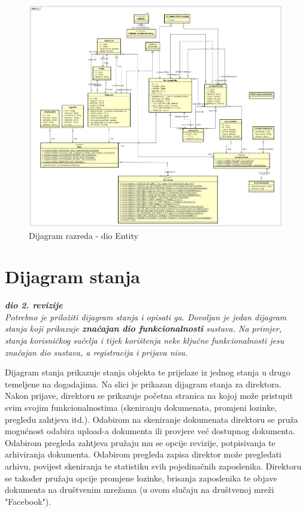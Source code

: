 			\begin{figure}[H]
				\includegraphics[scale=0.5]{slike/dijagram_razreda_entity.png} %
				\centering
				\caption{Dijagram razreda - dio Entity}
				\label{fig:promjene}
			\end{figure}
			
			
			
			\eject
		
		\iffalse
		\section{Dijagram stanja}
			
			
			\textbf{\textit{dio 2. revizije}}\\
			
			\textit{Potrebno je priložiti dijagram stanja i opisati ga. Dovoljan je jedan dijagram stanja koji prikazuje \textbf{značajan dio funkcionalnosti} sustava. Na primjer, stanja korisničkog sučelja i tijek korištenja neke ključne funkcionalnosti jesu značajan dio sustava, a registracija i prijava nisu. }
			
			Dijagram stanja prikazuje stanja objekta te prijelaze iz jednog stanja u drugo temeljene na dogadajima. Na slici je prikazan dijagram stanja za direktora. Nakon prijave, direktoru se prikazuje početna stranica na kojoj može pristupit svim svojim funkcionalnostima (skeniranju dokumenata, promjeni lozinke, pregledu zahtjeva itd.). Odabirom na skeniranje dokumenata direktoru se pruža mogućnost odabira upload-a dokumenta ili provjere već dostupnog dokumenta. Odabirom pregleda zahtjeva pružaju mu se opcije revizije, potpisivanja te arhiviranja dokumenta. Odabirom pregleda zapisa direktor može pregledati arhivu, povijest skeniranja te statistiku svih pojedinačnih zaposlenika. Direktoru se također pružaju opcije promjene lozinke, brisanja zaposlenika te objave dokumenta na društvenim mrežama (u ovom slučaju na društvenoj mreži "Facebook").
			
